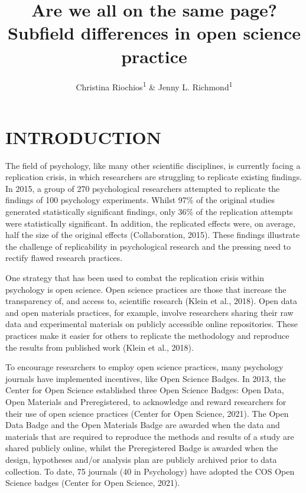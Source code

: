 \documentclass[
  english,
  man]{apa6}
\title{Are we all on the same page? Subfield differences in open science practice}
\author{Christina Riochios\textsuperscript{1} \& Jenny L. Richmond\textsuperscript{1}}
\date{}
\affiliation{\vspace{0.5cm}\textsuperscript{1} University of New South Wales}
\begin{document}
\maketitle

\hypertarget{introduction}{%
\section{INTRODUCTION}\label{introduction}}

The field of psychology, like many other scientific disciplines, is currently facing a replication crisis, in which researchers are struggling to replicate existing findings. In 2015, a group of 270 psychological researchers attempted to replicate the findings of 100 psychology experiments. Whilst 97\% of the original studies generated statistically significant findings, only 36\% of the replication attempts were statistically significant. In addition, the replicated effects were, on average, half the size of the original effects (Collaboration, 2015). These findings illustrate the challenge of replicability in psychological research and the pressing need to rectify flawed research practices.

One strategy that has been used to combat the replication crisis within psychology is open science. Open science practices are those that increase the transparency of, and access to, scientific research (Klein et al., 2018). Open data and open materials practices, for example, involve researchers sharing their raw data and experimental materials on publicly accessible online repositories. These practices make it easier for others to replicate the methodology and reproduce the results from published work (Klein et al., 2018).

To encourage researchers to employ open science practices, many psychology journals have implemented incentives, like Open Science Badges. In 2013, the Center for Open Science established three Open Science Badges: Open Data, Open Materials and Preregistered, to acknowledge and reward researchers for their use of open science practices (Center for Open Science, 2021). The Open Data Badge and the Open Materials Badge are awarded when the data and materials that are required to reproduce the methods and results of a study are shared publicly online, whilst the Preregistered Badge is awarded when the design, hypotheses and/or analysis plan are publicly archived prior to data collection. To date, 75 journals (40 in Psychology) have adopted the COS Open Science badges (Center for Open Science, 2021).
\end{document}
